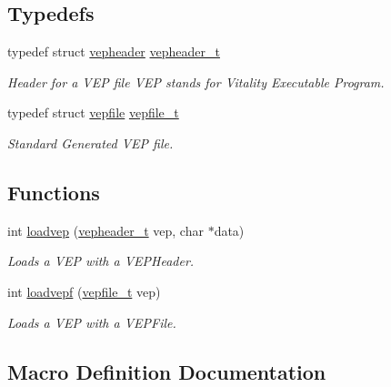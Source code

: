 \subsection*{Typedefs}
\begin{DoxyCompactItemize}
\item 
typedef struct \hyperlink{a00115}{vepheader} \hyperlink{a00089_a78392c340e1fe1be344df81d1438b74f_a78392c340e1fe1be344df81d1438b74f}{vepheader\+\_\+t}
\begin{DoxyCompactList}\small\item\em Header for a V\+EP file V\+EP stands for Vitality Executable Program. \end{DoxyCompactList}\item 
typedef struct \hyperlink{a00119}{vepfile} \hyperlink{a00089_af285fc2949acac5b7aa6f065c8811960_af285fc2949acac5b7aa6f065c8811960}{vepfile\+\_\+t}
\begin{DoxyCompactList}\small\item\em Standard Generated V\+EP file. \end{DoxyCompactList}\end{DoxyCompactItemize}
\subsection*{Functions}
\begin{DoxyCompactItemize}
\item 
int \hyperlink{a00089_ad5530515939c1e3332746affa700c759_ad5530515939c1e3332746affa700c759}{loadvep} (\hyperlink{a00089_a78392c340e1fe1be344df81d1438b74f_a78392c340e1fe1be344df81d1438b74f}{vepheader\+\_\+t} vep, char $\ast$data)
\begin{DoxyCompactList}\small\item\em Loads a V\+EP with a V\+E\+P\+Header. \end{DoxyCompactList}\item 
int \hyperlink{a00089_a7d608b906676086d77937044205aad33_a7d608b906676086d77937044205aad33}{loadvepf} (\hyperlink{a00089_af285fc2949acac5b7aa6f065c8811960_af285fc2949acac5b7aa6f065c8811960}{vepfile\+\_\+t} vep)
\begin{DoxyCompactList}\small\item\em Loads a V\+EP with a V\+E\+P\+File. \end{DoxyCompactList}\end{DoxyCompactItemize}


\subsection{Macro Definition Documentation}
\mbox{\label{a00089_a269ec657dd35349b74056083e6ba09c0_a269ec657dd35349b74056083e6ba09c0}} 
